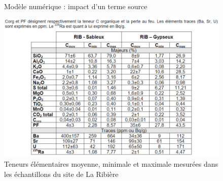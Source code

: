 \documentclass{article}
\begin{document}
\begin{figure}[H]   
    \centering
    \hfill
    \caption{Modèle numérique : impact d'un terme source}
    \label{fig:num_ts}
\end{figure}

\begin{figure}[H]
    \centering
    \includegraphics[width = \textwidth]{A_III_B_2_1.png}
    \caption{Teneurs élémentaires moyenne, minimale et maximale mesurées dans les échantillons du site de La Ribière \cite{caracterisation_residus_2014}} 
    \label{fig:rib_element_concentration}
\end{figure}
\end{document}
